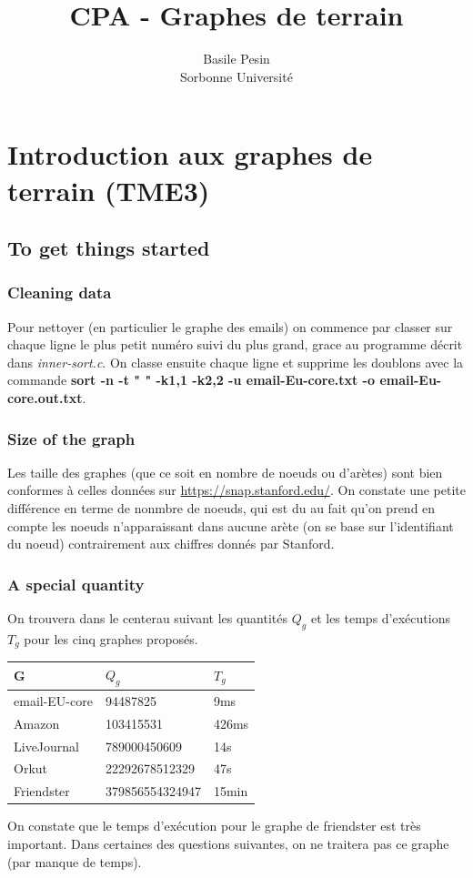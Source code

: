 \documentclass[a4paper]{report}
\title{CPA - Graphes de terrain}
\author{Basile Pesin\\Sorbonne Université}
\begin{document}
\maketitle

\chapter{Introduction aux graphes de terrain (TME3)}

\section{To get things started}

\subsection*{Cleaning data}
Pour nettoyer (en particulier le graphe des emails) on commence par classer sur chaque ligne le plus petit numéro suivi du plus grand, grace au programme décrit dans \textit{inner-sort.c}. On classe ensuite chaque ligne et supprime les doublons avec la commande \textbf{sort -n -t " " -k1,1 -k2,2 -u email-Eu-core.txt -o email-Eu-core.out.txt}.

\subsection*{Size of the graph}
Les taille des graphes (que ce soit en nombre de noeuds ou d'arètes) sont bien conformes à celles données sur \url{https://snap.stanford.edu/}. On constate une petite différence en terme de nonmbre de noeuds, qui est du au fait qu'on prend en compte les noeuds n'apparaissant dans aucune arète (on se base sur l'identifiant du noeud) contrairement aux chiffres donnés par Stanford.

\subsection*{A special quantity}
On trouvera dans le centerau suivant les quantités $Q_g$ et les temps d'exécutions $T_g$ pour les cinq graphes proposés.

\begin{center}
  \begin{tabular}{|l|l|l|}
    \hline
    G & $Q_g$ & $T_g$ \\
    \hline
    email-EU-core & 94487825 & 9ms\\
    Amazon & 103415531 & 426ms \\
    LiveJournal & 789000450609 & 14s \\
    Orkut & 22292678512329 & 47s \\
    Friendster & 379856554324947 & 15min \\
    \hline
  \end{tabular}
\end{center}
On constate que le temps d'exécution pour le graphe de friendster est très important. Dans certaines des questions suivantes, on ne traitera pas ce graphe (par manque de temps).
\end{document}
